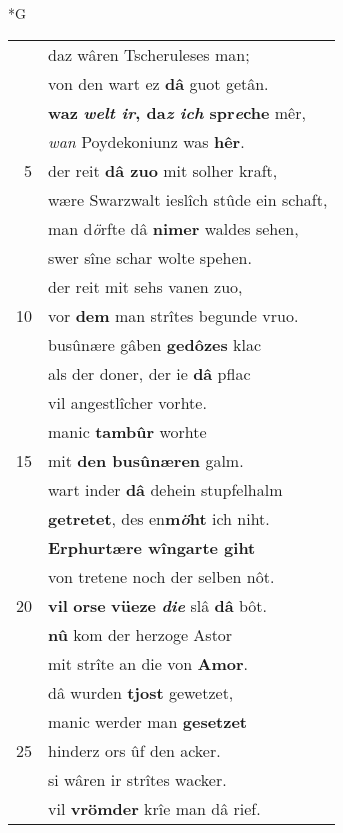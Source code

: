 \documentclass[8pt,a4paper,notitlepage]{article}
\begin{document}
\newpage
\begin{table}[ht]
\begin{minipage}[t]{0.5\linewidth}
\small
\begin{center}*G
\end{center}
\begin{tabular}{rl}
 & daz wâren Tscheruleses man;\\ 
 & von den wart ez \textbf{dâ} guot getân.\\ 
 & \textbf{waz} \textbf{\textit{welt ir}, da\textit{z} \textit{ich} spr\textit{e}che} mêr,\\ 
 & \textit{wan} Poydekoniunz was \textbf{hêr}.\\ 
5 & der reit \textbf{dâ zuo} mit solher kraft,\\ 
 & wære Swarzwalt ieslîch stûde ein schaft,\\ 
 & man d\textit{ö}rfte dâ \textbf{nimer} waldes sehen,\\ 
 & swer sîne schar wolte spehen.\\ 
 & der reit mit sehs vanen zuo,\\ 
10 & vor \textbf{dem} man strîtes begunde vruo.\\ 
 & busûnære gâben \textbf{gedôzes} klac\\ 
 & als der doner, der ie \textbf{dâ} pflac\\ 
 & vil angestlîcher vorhte.\\ 
 & manic \textbf{tambûr} worhte\\ 
15 & mit \textbf{den busûnæren} galm.\\ 
 & wart inder \textbf{dâ} dehein stupfelhalm\\ 
 & \textbf{getretet}, des en\textbf{m\textit{ö}ht} ich niht.\\ 
 & \textbf{Erphurtære wîngarte giht}\\ 
 & von tretene noch der selben nôt.\\ 
20 & \textbf{vil} \textbf{orse} \textbf{vüeze} \textit{\textbf{die}} slâ \textbf{dâ} bôt.\\ 
 & \textbf{nû} kom der herzoge Astor\\ 
 & mit strîte an die von \textbf{Amor}.\\ 
 & dâ wurden \textbf{tjost} gewetzet,\\ 
 & manic werder man \textbf{gesetzet}\\ 
25 & hinderz ors ûf den acker.\\ 
 & si wâren ir strîtes wacker.\\ 
 & vil \textbf{vrömder} krîe man dâ rief.\\ 

\end{tabular}
\end{minipage}
\end{table}
\end{document}
